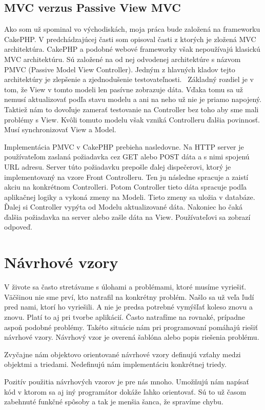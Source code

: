 \documentclass[12pt]{book}
\begin{document}
\subsection{MVC verzus Passive View MVC}
Ako som už spominal vo východiskách, moja práca bude založená na frameworku CakePHP. V predchádzajúcej časti som opisoval časti z ktorých je zložená MVC architektúra. CakePHP a podobné webové frameworky však nepoužívajú klasickú MVC architektúru. Sú založené na od nej odvodenej architektúre s názvom PMVC (Passive Model View Controller). Jedným z hlavných kladov tejto architektúry je zlepšenie a zjednodušenie testovateľnosti. \cite{PMVC}\ Základný rozdiel je v tom, že View v tomto modeli len pasívne zobrazuje dáta. Vďaka tomu sa už nemusí aktualizovať podľa stavu modelu a ani na neho už nie je priamo napojený. Taktiež nám to dovoľuje zamerať testovanie na Controller bez toho aby sme mali problémy s View. Kvôli tomuto modelu však vzniká Controlleru ďalšia povinnosť. Musí synchronizovať View a Model. 

Implementácia PMVC v CakePHP prebieha nasledovne. Na HTTP server je používateľom zaslaná požiadavka cez GET alebo POST dáta a s nimi spojenú URL adresu. Server túto požiadavku prepošle ďalej dispečerovi, ktorý je implementovaný na vzore Front Controlleru. Ten ju následne spracuje a zaistí akciu na konkrétnom Controlleri. Potom Controller tieto dáta spracuje podľa aplikačnej logiky a vykoná zmeny na Modeli. Tieto zmeny sa uložia v databáze. Ďalej si Controller vypýta od Modelu aktualizované dáta. Nakoniec ho čaká ďalšia požiadavka na server alebo zašle dáta na View. Používateľovi sa zobrazí odpoveď.

\section{Návrhové vzory}
V živote sa často stretávame s úlohami a problémami, ktoré musíme vyriešiť. Väčšinou nie sme prví, kto natrafil na konkrétny problém. Našlo sa už veľa ľudí pred nami, ktorí ho vyriešili. A nie je predsa potrebné vymýšľať koleso znovu a znovu. Platí to aj pri tvorbe aplikácií.  Často natrafíme na rovnaké, prípadne aspoň podobné problémy. Takéto situácie nám pri programovaní pomáhajú riešiť návrhové vzory. Návrhový vzor je overená šablóna alebo popis riešenia problému.

Zvyčajne nám objektovo orientované návrhové vzory definujú vzťahy medzi objektmi a triedami. Nedefinujú nám implementáciu konkrétnej triedy.  

Pozitív použitia návrhových vzorov je pre nás mnoho. Umožňujú nám napísať kód v ktorom sa aj iný programátor dokáže ľahko orientovať. Sú to už časom zabehnuté funkčné spôsoby a tak je menšia šanca, že spravíme chybu. 
\end{document}
